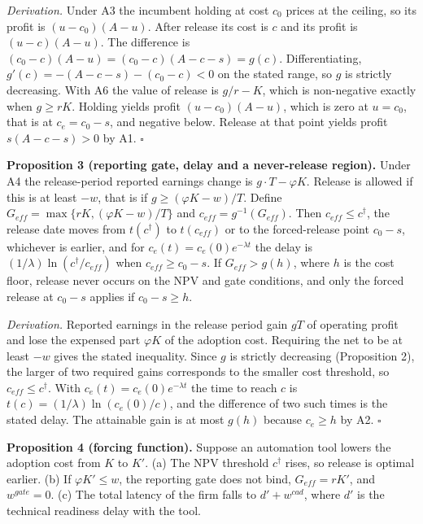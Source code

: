 \documentclass[10pt,letterpaper]{article}
\begin{document}
\emph{Derivation.} Under A3 the incumbent holding at cost \(c_0\) prices
at the ceiling, so its profit is \((u - c_0)(A - u)\). After release its
cost is \(c\) and its profit is \((u - c)(A - u)\). The difference is
\((c_0 - c)(A - u) = (c_0 - c)(A - c - s) = g(c)\). Differentiating,
\(g'(c) = -(A - c - s) - (c_0 - c) < 0\) on the stated range, so \(g\)
is strictly decreasing. With A6 the value of release is \(g/r - K\),
which is non-negative exactly when \(g \ge rK\). Holding yields profit
\((u - c_0)(A - u)\), which is zero at \(u = c_0\), that is at
\(c_e = c_0 - s\), and negative below. Release at that point yields
profit \(s(A - c - s) > 0\) by A1. \(\square\)

\textbf{Proposition 3 (reporting gate, delay and a never-release
region).} Under A4 the release-period reported earnings change is
\(g \cdot T - \varphi K\). Release is allowed if this is at least
\(-w\), that is if \(g \ge (\varphi K - w)/T\). Define
\(G_{eff} = \max\{rK, (\varphi K - w)/T\}\) and
\(c_{eff} = g^{-1}(G_{eff})\). Then \(c_{eff} \le c^\dagger\), the
release date moves from \(t(c^\dagger)\) to \(t(c_{eff})\) or to the
forced-release point \(c_0 - s\), whichever is earlier, and for
\(c_e(t) = c_e(0) e^{-\lambda t}\) the delay is
\((1/\lambda)\ln(c^\dagger / c_{eff})\) when \(c_{eff} \ge c_0 - s\). If
\(G_{eff} > g(h)\), where \(h\) is the cost floor, release never occurs
on the NPV and gate conditions, and only the forced release at
\(c_0 - s\) applies if \(c_0 - s \ge h\).

\emph{Derivation.} Reported earnings in the release period gain \(gT\)
of operating profit and lose the expensed part \(\varphi K\) of the
adoption cost. Requiring the net to be at least \(-w\) gives the stated
inequality. Since \(g\) is strictly decreasing (Proposition 2), the
larger of two required gains corresponds to the smaller cost threshold,
so \(c_{eff} \le c^\dagger\). With \(c_e(t) = c_e(0) e^{-\lambda t}\)
the time to reach \(c\) is \(t(c) = (1/\lambda)\ln(c_e(0)/c)\), and the
difference of two such times is the stated delay. The attainable gain is
at most \(g(h)\) because \(c_e \ge h\) by A2. \(\square\)

\textbf{Proposition 4 (forcing function).} Suppose an automation tool
lowers the adoption cost from \(K\) to \(K'\). (a) The NPV threshold
\(c^\dagger\) rises, so release is optimal earlier. (b) If
\(\varphi K' \le w\), the reporting gate does not bind,
\(G_{eff} = rK'\), and \(w^{gate} = 0\). (c) The total latency of the
firm falls to \(d' + w^{cad}\), where \(d'\) is the technical readiness
delay with the tool.
\end{document}
